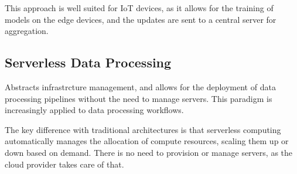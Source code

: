This approach is well suited for IoT devices, as it allows for the training of models on the edge devices, and the updates are sent to a central server for aggregation.

\subsection{Serverless Data Processing}
Abstracts infrastrcture management, and allows for the deployment of data processing pipelines without the need to manage servers.
This paradigm is increasingly applied to data
processing workflows.

The key difference with traditional architectures is that serverless computing automatically manages the allocation of compute resources, scaling them up or down based on demand.
There is no need to provision or manage servers, as the cloud provider takes care of that.
 
